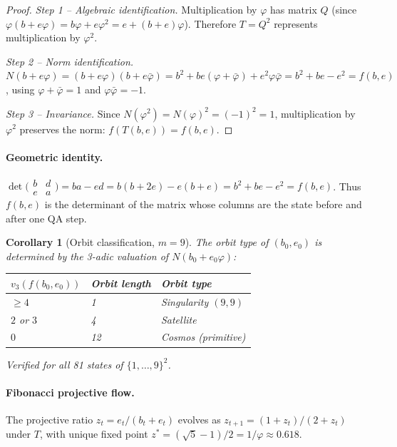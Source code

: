 \documentclass[11pt]{article}
\newtheorem{corollary}[theorem]{Corollary}
\theoremstyle{definition}
\theoremstyle{remark}
\begin{document}
\begin{proof}
\textit{Step 1 -- Algebraic identification.}
Multiplication by $\varphi$ has matrix $Q$ (since
$\varphi(b+e\varphi)=b\varphi+e\varphi^2=e+(b+e)\varphi$). Therefore $T=Q^2$
represents multiplication by $\varphi^2$.

\textit{Step 2 -- Norm identification.}
$N(b+e\varphi)=(b+e\varphi)(b+e\bar\varphi)=b^2+be(\varphi+\bar\varphi)+e^2\varphi\bar\varphi
=b^2+be-e^2=f(b,e)$, using $\varphi+\bar\varphi=1$ and $\varphi\bar\varphi=-1$.

\textit{Step 3 -- Invariance.}
Since $N(\varphi^2)=N(\varphi)^2=(-1)^2=1$, multiplication by $\varphi^2$ preserves
the norm: $f(T(b,e))=f(b,e)$.
\end{proof}

\paragraph{Geometric identity.}
$\det\bigl(\begin{smallmatrix}b&d\\e&a\end{smallmatrix}\bigr)
=ba-ed=b(b+2e)-e(b+e)=b^2+be-e^2=f(b,e)$. Thus $f(b,e)$ is the determinant of
the matrix whose columns are the state before and after one QA step.

\begin{corollary}[Orbit classification, $m=9$]
The orbit type of $(b_0,e_0)$ is determined by the 3-adic valuation of
$N(b_0+e_0\varphi)$:

\begin{center}
\begin{tabular}{lll}
\toprule
$v_3(f(b_0,e_0))$ & Orbit length & Orbit type \\
\midrule
$\geq 4$ & 1 & Singularity $(9,9)$ \\
$2$ or $3$ & 4 & Satellite \\
$0$ & 12 & Cosmos (primitive) \\
\bottomrule
\end{tabular}
\end{center}
Verified for all 81 states of $\{1,\ldots,9\}^2$.
\end{corollary}

\paragraph{Fibonacci projective flow.}
The projective ratio $z_t=e_t/(b_t+e_t)$ evolves as $z_{t+1}=(1+z_t)/(2+z_t)$
under $T$, with unique fixed point $z^*=(\sqrt{5}-1)/2=1/\varphi\approx0.618$.
\end{document}
